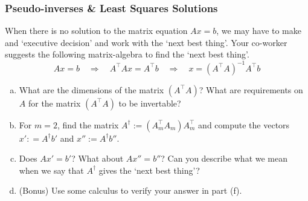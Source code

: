 \documentclass[11pt,oneside]{article}
\theoremstyle{definition}
\theoremstyle{definition}
\theoremstyle{remark}
\numberwithin{equation}{section}
\begin{document}
\subsubsection*{Pseudo-inverses \& Least Squares Solutions}
When there is no solution to the matrix equation $Ax = b$, we may have to make and `executive decision' and work with the `next best thing'. Your co-worker suggests the following matrix-algebra to find the `next best thing'.
\begin{equation*}
Ax = b \quad \Rightarrow \quad A^\top A x = A^\top b \quad \Rightarrow \quad x = (A^\top A)^{-1} A^\top b
\end{equation*}
\begin{enumerate}[(a), resume]
    \item What are the dimensions of the matrix $(A^\top A)$? What are requirements on $A$ for the matrix $(A^\top A)$ to be invertable?
    \item For $m = 2$, find the matrix $A^\dagger:=(A_m^\top A_m) A_m^\top$ and compute the vectors $x': = A^\dagger b'$ and $x'':=A^\dagger b''$.
    \item Does $Ax' = b'$? What about $Ax'' = b''$? Can you describe what we mean when we say that $A^\dagger$ gives the `next best thing'?
    \item (Bonus) Use some calculus to verify your answer in part (f).
\end{enumerate}


\newpage
\end{document}

